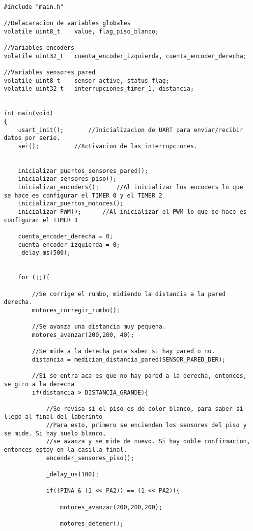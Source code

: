 \documentclass[a4paper,12pt]{article}   %
\begin{document}
\begin{lstlisting}

#include "main.h"

//Delacaracion de variables globales
volatile uint8_t    value, flag_piso_blanco;

//Variables encoders
volatile uint32_t   cuenta_encoder_izquierda, cuenta_encoder_derecha;

//Variables sensores pared
volatile uint8_t    sensor_active, status_flag;
volatile uint32_t   interrupciones_timer_1, distancia;


int main(void)
{
    usart_init();		//Inicializacion de UART para enviar/recibir datos por serie.
    sei();			//Activacion de las interrupciones.


    inicializar_puertos_sensores_pared();
    inicializar_sensores_piso();
    inicializar_encoders();     //Al inicializar los encoders lo que se hace es configurar el TIMER 0 y el TIMER 2
    inicializar_puertos_motores();
    inicializar_PWM();		//Al inicializar el PWM lo que se hace es configurar el TIMER 1

    cuenta_encoder_derecha = 0;
    cuenta_encoder_izquierda = 0;
    _delay_ms(500);


	for (;;){

        //Se corrige el rumbo, midiendo la distancia a la pared derecha.
        motores_corregir_rumbo();

        //Se avanza una distancia muy pequena.
        motores_avanzar(200,200, 40);

        //Se mide a la derecha para saber si hay pared o no.
        distancia = medicion_distancia_pared(SENSOR_PARED_DER);

        //Si se entra aca es que no hay pared a la derecha, entonces, se giro a la derecha
        if(distancia > DISTANCIA_GRANDE){

            //Se revisa si el piso es de color blanco, para saber si llego al final del laberinto
            //Para esto, primero se encienden los sensores del piso y se mide. Si hay suelo blanco,
            //se avanza y se mide de nuevo. Si hay doble confirmacion, entonces estoy en la casilla final.
            encender_sensores_piso();

            _delay_us(100);

            if((PINA & (1 << PA2)) == (1 << PA2)){

                motores_avanzar(200,200,200);

                motores_detener();


\end{lstlisting}
\end{document}
